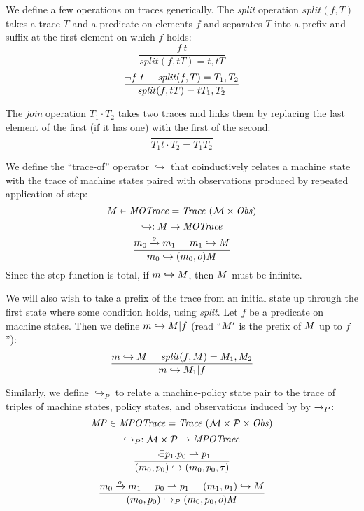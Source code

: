 \documentclass[acmsmall,review,anonymous]{acmart}\settopmatter{printfolios=true,printccs=false,printacmref=false}
\begin{document}
We define a few operations on traces generically.
The {\it split} operation \(\mathit{split}(f,T)\) takes a trace \(T\) and a predicate on elements \(f\) and
separates \(T\) into a prefix and suffix at the first element on which \(f\) holds:
  \[\frac{f\ t}
         {\mathit{split}(f,tT) = t, tT}\]
  \[\frac{\neg f\ t \hspace{.5cm} \mathit{split}(f,T) = T_1,T_2}
         {\mathit{split}(f,tT) = tT_1,T_2}\]

The {\it join} operation \(T_1 \cdot T_2\) takes two traces and links them by replacing the last element
of the first (if it has one) with the first of the second:
  \[\frac{}
         {T_1t \cdot T_2 = T_1 T_2}\]

We define the ``trace-of'' operator \(\hookrightarrow\) that coinductively
relates a machine state with the trace of machine states paired with
observations produced by repeated application of step:
\[M \in \mathit{MOTrace} = \mathit{Trace}\ ({\mathcal M} \times \mathit{Obs})\]
\[\hookrightarrow : M \rightarrow \mathit{MOTrace}\]
%
\[\frac{m_0 \xrightarrow{o} m_1 \hspace{.5cm} m_1 \hookrightarrow M}
       {m_0 \hookrightarrow (m_0,o) M}\]
%
Since the step function is total, if \(m \hookrightarrow M\),
then \(M\) must be infinite.

We will also wish to take a prefix of the trace from an initial state up through the first state where
some condition holds, using {\it split}. Let \(f\) be a predicate on machine states. Then we define
\(m \hookrightarrow M | f\) (read ``\(M'\) is the prefix of \(M\) up to \(f\)''):
  \[\frac{m \hookrightarrow M \hspace{.5cm} \mathit{split}(f,M) = M_1,M_2}
         {m \hookrightarrow M_1 | f}\]

Similarly, we define \(\hookrightarrow_P\) to relate a machine-policy
state pair to the trace of triples of machine states, policy states,
and observations induced by by \(\xrightarrow{}_P\):
%
  \[\MPT \in \mathit{MPOTrace} = \mathit{Trace}\ (\MACHS \times \POLS \times \OBSS)\]
  \[\hookrightarrow_P : {\mathcal M} \times \mathcal{P} \rightarrow \mathit{MPOTrace}\]
  \[\frac{\neg \exists p_1 . p_0 \rightharpoonup p_1}
         {(m_0,p_0) \hookrightarrow (m_0,p_0,\tau)}\]
  \[\frac{m_0 \xrightarrow{o} m_1 \hspace{.5cm} p_0 \rightharpoonup p_1 \hspace{.5cm}
            (m_1,p_1) \hookrightarrow M}
         {(m_0,p_0) \hookrightarrow_P (m_0,p_0,o) M}\]
\end{document}
